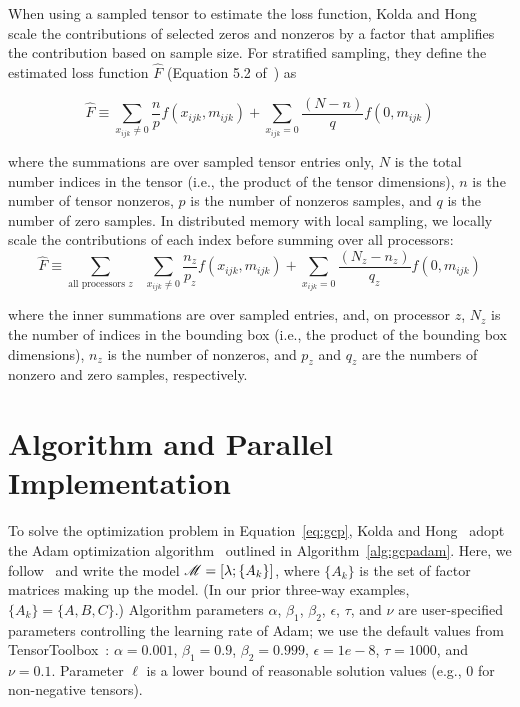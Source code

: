 When using a sampled tensor to estimate the loss function, 
Kolda and Hong~\cite{KH19} scale the contributions of selected
zeros and nonzeros by a factor that amplifies the contribution based on sample
size.  For stratified sampling, they define the estimated loss function 
$\hat F$ (Equation 5.2 of~\cite{KH19}) as 

$$\hat F \equiv \sum_{x_{ijk} \ne 0} \frac{n}{p} f(x_{ijk},m_{ijk}) + 
                \sum_{x_{ijk} = 0} \frac{(N-n)}{q} f(0, m_{ijk}) $$

where the summations are over sampled tensor entries only,
$N$ is the total number indices in the tensor (i.e., the product
of the tensor dimensions), $n$ is the number of tensor nonzeros, $p$ is
the number of nonzeros samples, and $q$ is the number of zero samples.
In distributed memory with local sampling, we locally scale the contributions 
of each index before summing over all processors:
\begin{equation}
\hat F \equiv \sum_{\text{all processors } z} \text{       }
   \sum_{x_{ijk} \ne 0} \frac{n_z}{p_z}  f(x_{ijk},m_{ijk}) +
   \sum_{x_{ijk} = 0} \frac{(N_z-n_z)}{q_z} f(0, m_{ijk})
\label{eq:localloss}
\end{equation}

where the inner summations are over sampled entries, and, on processor $z$, 
$N_z$ is the number of indices in the bounding box 
(i.e., the product of the bounding box dimensions), $n_z$ is the number of 
nonzeros, and $p_z$ and $q_z$ are the numbers of nonzero
and zero samples, respectively.



\section{Algorithm and Parallel Implementation} \label{sec:gcp_alg}

To solve the optimization 
problem in Equation~\ref{eq:gcp}, Kolda and Hong~\cite{KH19} adopt
the Adam optimization algorithm~\cite{KB15} outlined in 
Algorithm~\ref{alg:gcpadam}.
Here, we follow~\cite{KH19} and write the model $\M = [\lambda;\{A_k\}]$,
where $\{ A_k \}$ is the set of factor matrices making up the model.
(In our prior three-way examples, $\{A_k\} = \{A,B,C\}$.)
Algorithm parameters $\alpha$, $\beta_1$, $\beta_2$, $\epsilon$, $\tau$, and
$\nu$ are user-specified parameters controlling the learning rate of 
Adam; we use the default values from TensorToolbox~\cite{TensorToolbox}:
$\alpha=0.001$, $\beta_1=0.9$, $\beta_2=0.999$, $\epsilon=1e-8$, $\tau=1000$, 
and $\nu=0.1$.  Parameter $\ell$ is a lower bound of reasonable solution values
(e.g., $0$ for non-negative tensors).  


